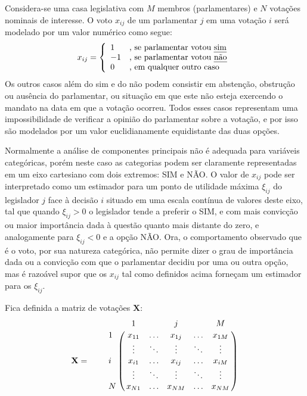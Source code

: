 \documentclass[a4paper, 12pt]{article}
\newcommand{\tikzmark}[1]{\tikz[overlay, remember picture] \coordinate (#1);}
\let\bbordermatrix\bordermatrix
\begin{document}
Considera-se uma casa legislativa com $M$ membros (parlamentares) e $N$ votações nominais de interesse. O voto $x_{ij}$ de um parlamentar $j$ em uma votação $i$ será modelado por um valor numérico como segue:
\[
   x_{ij} = \left\{ 
     \begin{array}{l l}
        1 & \text{, se parlamentar votou \emph{sim}} \\
       -1 & \text{, se parlamentar votou \emph{não}} \\
        0 & \text{, em qualquer outro caso} 
     \end{array} \right.
\]
Os outros casos além do sim e do não podem consistir em abstenção, obstrução ou ausência do parlamentar, ou situação em que este não esteja exercendo o mandato na data em que a votação ocorreu. Todos esses casos representam uma impossibilidade de verificar a opinião do parlamentar sobre a votação, e por isso são modelados por um valor euclidianamente equidistante das duas opções.

Normalmente a análise de componentes principais não é adequada para variáveis categóricas, porém neste caso as categorias podem ser claramente representadas em um eixo cartesiano com dois extremos: SIM e NÃO. O valor de $x_{ij}$ pode ser interpretado como um estimador para um ponto de utilidade máxima $\xi_{ij}$ do legislador $j$ face à decisão $i$ situado em uma escala contínua de valores deste eixo, tal que quando $\xi_{ij} > 0$ o legislador tende a preferir o SIM, e com mais convicção ou maior importância dada à questão quanto mais distante do zero, e analogamente para $\xi_{ij} < 0$ e a opção NÃO. Ora, o comportamento observado que é o voto, por sua natureza categórica, não permite dizer o grau de importância dada ou a convicção com que o parlamentar decidiu por uma ou outra opção, mas é razoável supor que os $x_{ij}$ tal como definidos acima forneçam um estimador para os $\xi_{ij}$.

Fica definida a matriz de votações $\mathbf{X}$:
\medskip{}
\[
  \mathbf{X} = \qquad \bbordermatrix{~  & \tikzmark{harrowleft} 1 & ~ & j & ~
                        & M\tikzmark{harrowright}  \cr
                    \tikzmark{varrowtop} 
                    1 & x_{11} & \ldots & x_{1j} & \ldots & x_{1M} \cr
                    ~ & \vdots & \ddots & \vdots & \ddots & \vdots \cr
                    i & x_{i1} & \ldots & x_{ij} & \ldots & x_{iM} \cr
                    ~ & \vdots & \ddots & \vdots & \ddots & \vdots \cr
                    \tikzmark{varrowbottom}
                    N & x_{N1} & \ldots & x_{NM} & \ldots & x_{NM} \cr
                    }
\]
\end{document}
